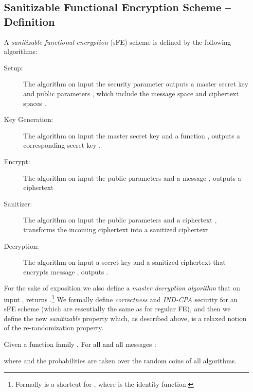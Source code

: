 \documentclass{llncs}
\begin{document}
\subsection{Sanitizable Functional Encryption Scheme -- Definition}\label{sec:sfe}
A \emph{sanitizable functional encryption} (sFE) scheme is defined by the following algorithms:
\begin{description}
\item[Setup:] The  algorithm on input the security parameter  outputs a master secret key  and public parameters , which include the message space  and ciphertext spaces .

\item[Key Generation:] The  algorithm on input the master secret key  and a function , outputs a corresponding secret key .

\item[Encrypt:] The  algorithm on input the public parameters  and a message , outputs a ciphertext 

\item[Sanitizer:] The  algorithm on input the public parameters  and a ciphertext , transforms the incoming ciphertext into a sanitized ciphertext  

\item[Decryption:] The  algorithm on input a secret key  and a sanitized ciphertext  that encrypts message , outputs .





\end{description}

For the sake of exposition we also define a \emph{master decryption algorithm} that on input , returns .\footnote{Formally  is a shortcut for , where  is the identity function.} We formally define \emph{correctness} and \emph{IND-CPA} security for an sFE scheme (which are essentially the same as for regular FE), and then we define the new \emph{sanitizable} property which, as described above, is a relaxed notion of the re-randomization property.

\begin{defi}
Given a function family . For all  and all messages :
	
where  and the probabilities are taken over the random coins of all algorithms.
\end{defi}
\end{document}
